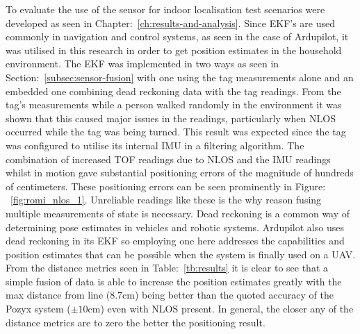 To evaluate the use of the sensor for indoor localisation test scenarios were developed as seen in Chapter:~\ref{ch:results-and-analysis}.
Since EKF's are used commonly in navigation and control systems, as seen in the case of Ardupilot, it was utilised in this research in order to get position estimates in the household environment.
The EKF was implemented in two ways as seen in Section:~\ref{subsec:sensor-fusion} with one using the tag measurements alone and an embedded one combining dead reckoning data with the tag readings.
From the tag's measurements while a person walked randomly in the environment it was shown that this caused major issues in the readings, particularly when NLOS occurred while the tag was being turned.
This result was expected since the tag was configured to utilise its internal IMU in a filtering algorithm.
The combination of increased TOF readings due to NLOS and the IMU readings whilst in motion gave substantial positioning errors of the magnitude of hundreds of centimeters.
These positioning errors can be seen prominently in Figure: ~\ref{fig:romi_nlos_1}.
Unreliable readings like these is the why reason fusing multiple measurements of state is necessary.
Dead reckoning is a common way of determining pose estimates in vehicles and robotic systems.
Ardupilot also uses dead reckoning in its EKF so employing one here addresses the capabilities and position estimates that can be possible when the system is finally used on a UAV.
From the distance metrics seen in Table:~\ref{tb:results} it is clear to see that a simple fusion of data is able to increase the position estimates greatly with the max distance from line (8.7cm) being better than the quoted accuracy of the Pozyx system ($\pm10$cm) even with NLOS present.
In general, the closer any of the distance metrics are to zero the better the positioning result.

